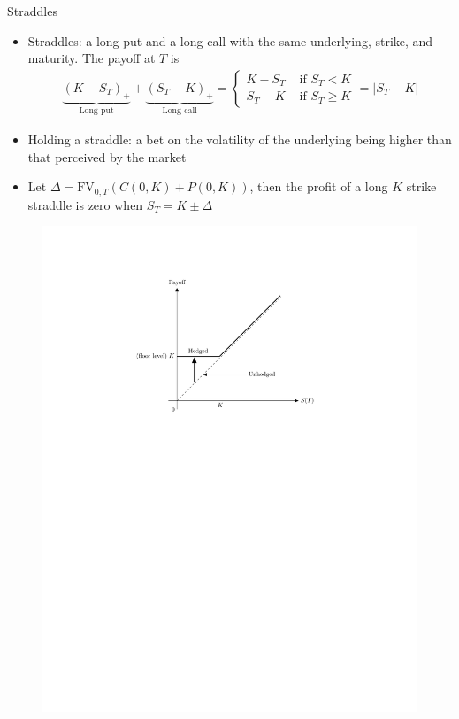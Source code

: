 \documentclass[10pt,handout]{beamer}
\theoremstyle{definition}
\begin{document}
\begin{frame}{Straddles}
  \begin{itemize}
    \item Straddles: a long put and a long call with the same underlying, strike, and maturity. The payoff at $T$ is \vspace{-1mm}
      \begin{align*}
        \underbrace{(K - S_T)_+}_{\text{Long put}} + \underbrace{(S_T - K)_+}_{\text{Long call}} = \begin{cases}K - S_T & \text{ if } S_T < K\\ S_T - K & \text{ if } S_T\geqslant K\end{cases} = |S_T - K|
      \end{align*}
    \item Holding a straddle: a bet on the volatility of the underlying being higher than that perceived by the market
    \item Let $\Delta = \mathrm{FV}_{0,T}(C(0, K) + P(0, K))$, then the profit of a long $K$ strike straddle is zero when $S_T = K\pm\Delta$
  \end{itemize}
  \begin{figure}[!htbp]
    \centering
    \includegraphics[scale=0.6,page=12]{fig/note08/lo.pdf}
  \end{figure}
\end{frame}
\end{document}
